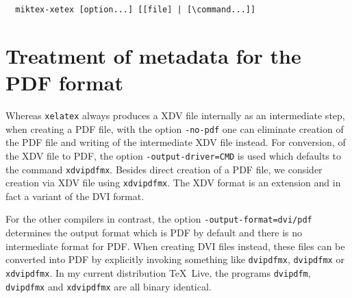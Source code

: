 \documentclass[a4paper]{article}%
\newcommand{\lualatex}{\texttt{lualatex}}
\newcommand{\xelatex}{\texttt{xelatex}}
\newcommand{\texlive}{\TeX~Live}
\newcommand{\miktex}{MiKTeX}
\begin{document}


  
  
  

\begin{verbatim}
  miktex-xetex [option...] [[file] | [\command...]]
\end{verbatim}







\section{Treatment of metadata for the PDF format}\label{sec:metaPDF}

Whereas \xelatex{} always produces a XDV file internally as an intermediate step, 
when creating a PDF file, with the option \texttt{-no-pdf} 
one can eliminate creation of the PDF file and writing of the intermediate XDV file instead. 
For conversion, of the XDV file to PDF, the option \texttt{-output-driver=CMD} 
is used which defaults to the command \texttt{xdvipdfmx}. 
Besides direct creation of a PDF file, 
we consider creation via XDV file using \texttt{xdvipdfmx}. 
The XDV format is an extension and in fact a variant of the DVI format. 

For the other compilers in contrast, the option \texttt{-output-format=dvi/pdf} 
determines the output format which is PDF by default 
and there is no intermediate format for PDF\@. 
When creating DVI files instead, these files can be converted into PDF 
by explicitly invoking something like 
\texttt{dvipdfmx}, \texttt{dvipdfmx} or \texttt{xdvipdfmx}. 
In my current distribution \texlive, 
the programs \texttt{dvipdfm}, \texttt{dvipdfmx} and \texttt{xdvipdfmx} 
are all binary identical. 
\end{document}
